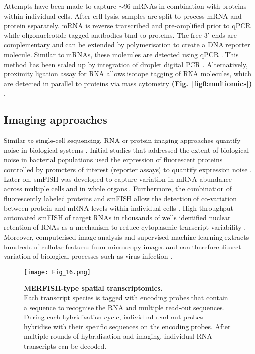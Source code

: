Attempts have been made to capture $\sim$96 mRNAs in combination with proteins within individual cells. After cell lysis, samples are split to process mRNA and protein separately. mRNA is reverse transcribed and pre-amplified prior to \gls{qPCR} while oligonucleotide tagged antibodies bind to proteins. The free 3’-ends are complementary and can be extended by polymerisation to create a DNA reporter molecule. Similar to mRNAs, these molecules are detected using qPCR \citep{Darmanis2016}. This method has been scaled up by integration of droplet digital PCR \citep{Albayrak2016}. Alternatively, proximity ligation assay for RNA allows isotope tagging of RNA molecules, which are detected in parallel to proteins via mass cytometry \textbf{(Fig.~\ref{fig0:multiomics})} \citep{Frei2016}.

\subsection{Imaging approaches}

Similar to single-cell sequencing, RNA or protein imaging approaches quantify noise in biological systems \citep{Harton2017a}. Initial studies that addressed the extent of biological noise in bacterial populations used the expression of fluorescent proteins controlled by promoters of interest (reporter assays) to quantify expression noise \citep{Elowitz2002, Blake2003}. Later on, \gls{smFISH} was developed to capture variation in mRNA abundance across multiple cells \citep{Fang2013a, Lyubimova2013, Sanchez2013} and in whole organs \citep{Yang2014b}. Furthermore, the combination of fluorescently labeled proteins and smFISH allow the detection of co-variation between protein and mRNA levels within individual cells \citep{Taniguchi2011}. High-throughput automated smFISH of target RNAs in thousands of wells \citep{Battich2013} identified nuclear retention of RNAs as a mechanism to reduce cytoplasmic transcript variability \citep{Battich2015a}. Moreover, computerised image analysis and supervised machine learning extracts hundreds of cellular features from microscopy images and can therefore dissect variation of biological processes such as virus infection \citep{Snijder2009}.

\begin{figure}[!h]
\centering
\texttt{[image: Fig\_16.png]}
\caption[MERFISH-type spatial transcriptomics]{\textbf{MERFISH-type spatial transcriptomics.}\\
Each transcript species is tagged with encoding probes that contain a sequence to recognise the RNA and multiple read-out sequences. During each hybridisation cycle, individual read-out probes hybridise with their specific sequences on the encoding probes. After multiple rounds of hybridisation and imaging, individual RNA transcripts can be decoded.}
\label{fig0:MERFISH}
\end{figure}

